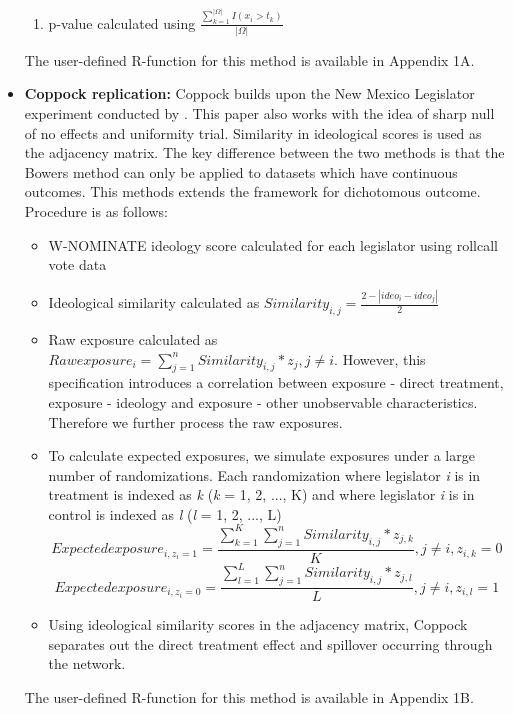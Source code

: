 \documentclass[12pt]{article}
\begin{document}
\begin{itemize}
\begin{enumerate}
\item p-value calculated using $\frac{\sum_{k=1}^{|\Omega|} I(x_i  > t_k)}{|\Omega|}$

\end{enumerate}

The user-defined R-function for this method is available in Appendix 1A.

\item {\bf Coppock replication:} Coppock builds upon the New Mexico Legislator experiment conducted by \citet{butler2011can}. This paper also works with the idea of sharp null of no effects and uniformity trial. Similarity in ideological scores is used as the adjacency matrix. The key difference between the two methods is that the Bowers method can only be applied to datasets which have continuous outcomes. This methods extends the framework for dichotomous outcome. Procedure is as follows:

\begin{itemize}

\item W-NOMINATE ideology score calculated for each legislator using rollcall vote data

\item Ideological similarity calculated as $Similarity_{i,j} = \frac{2 - |ideo_i - ideo_j|}{2}$

\item Raw exposure calculated as $Raw exposure_i =  \sum_{j=1}^{n}Similarity_{i,j} * z_j, j \neq i$. However, this specification introduces a correlation between exposure - direct treatment, exposure - ideology and exposure - other unobservable characteristics. Therefore we further process the raw exposures.

\item To calculate expected exposures, we simulate exposures under a large number of randomizations. Each randomization where legislator \textit{i} is in treatment is indexed as \textit{k} (\textit{k} = 1, 2, ..., K) and where legislator \textit{i} is in control is indexed as \textit{l} (\textit{l} = 1, 2, ..., L) $$Expected exposure_{i, z_i=1} =  \frac{\sum_{k=1}^{K}\sum_{j=1}^{n}Similarity_{i,j} * z_{j,k}}{K}, j \neq i, z_{i,k}=0$$ $$Expected exposure_{i, z_i=0} =  \frac{\sum_{l=1}^{L}\sum_{j=1}^{n}Similarity_{i,j} * z_{j,l}}{L}, j \neq i, z_{i,l}=1$$

\item Using ideological similarity scores in the adjacency matrix, Coppock separates out the direct treatment effect and spillover occurring through the network.

\end{itemize}

The user-defined R-function for this method is available in Appendix 1B.

\end{itemize}
\end{document}
